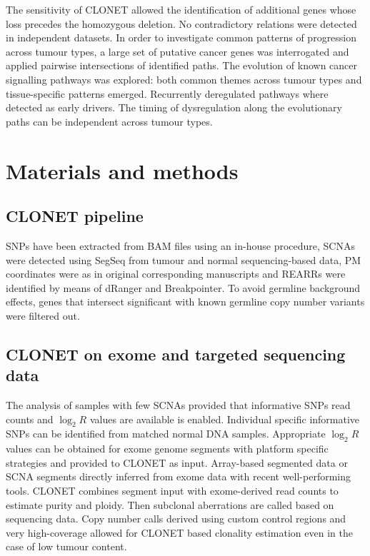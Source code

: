 	The sensitivity of CLONET allowed the identification of additional genes whose loss precedes the homozygous deletion.
	No contradictory relations were detected in independent datasets.
	In order to investigate common patterns of progression across tumour types, a large set of putative cancer genes was interrogated and applied pairwise intersections of identified paths.
	The evolution of known cancer signalling pathways was explored: both common themes across tumour types and tissue-specific patterns emerged.
	Recurrently deregulated pathways where detected as early drivers.
	The timing of dysregulation along the evolutionary paths can be independent across tumour types.

\section{Materials and methods}

	\subsection{CLONET pipeline}
	SNPs have been extracted from BAM files using an in-house procedure, SCNAs were detected using SegSeq from tumour and normal sequencing-based data, PM coordinates were as in original corresponding manuscripts and REARRs were identified by means of dRanger and Breakpointer.
	To avoid germline background effects, genes that intersect significant with known germline copy number variants were filtered out.

	\subsection{CLONET on exome and targeted sequencing data}
	The analysis of samples with few SCNAs provided that informative SNPs read counts and $\log_2 R$ values are available is enabled.
	Individual specific informative SNPs can be identified from matched normal DNA samples.
	Appropriate $\log_2 R$ values can be obtained for exome genome segments with platform specific strategies and provided to CLONET as input.
	Array-based segmented data or SCNA segments directly inferred from exome data with recent well-performing tools.
	CLONET combines segment input with exome-derived read counts to estimate purity and ploidy.
	Then subclonal aberrations are called based on sequencing data.
	Copy number calls derived using custom control regions and very high-coverage allowed for CLONET based clonality estimation even in the case of low tumour content.


